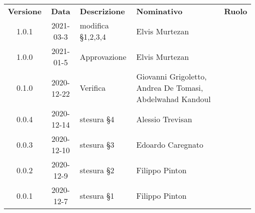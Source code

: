 {
\renewcommand{\arraystretch}{1.5}
\centering
\begin{longtable}{ c c  C{3.5cm}  C{4cm}  c }
    \rowcolor{\primaryColor}
    \textcolor{\secondaryColor}{
    \textbf{Versione}}     & \textcolor{\secondaryColor}{\textbf{Data}}       & \textcolor{\secondaryColor}
    {\textbf{Descrizione}} & \textcolor{\secondaryColor}{\textbf{Nominativo}} & \textcolor{\secondaryColor}{\textbf{Ruolo}}                                         \\


    1.0.1                  & 2021-03-3                                        & modifica §1,2,3,4          & Elvis Murtezan      & \amministratore{} \\
    1.0.0                  & 2021-01-5                                        & Approvazione               & Elvis Murtezan      & \responsabile{} \\

    0.1.0                  & 2020-12-22                                       & Verifica             & Giovanni Grigoletto, Andrea De Tomasi, Abdelwahad Kandoul  & \verificatore{} \\

    0.0.4               & 2020-12-14    & stesura §4 & Alessio Trevisan & \amministratore {} \\

    0.0.3               & 2020-12-10    & stesura §3 & Edoardo Caregnato & \amministratore {} \\

    0.0.2               & 2020-12-9    & stesura §2 & Filippo Pinton & \amministratore {} \\

    0.0.1               & 2020-12-7    & stesura §1 & Filippo Pinton & \amministratore {} \\



\end{longtable}
}